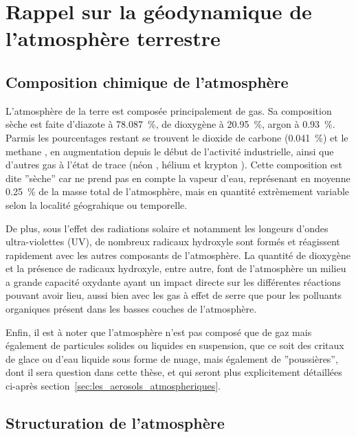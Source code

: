 
\section{Rappel sur la géodynamique de l'atmosphère terrestre}%
\label{sec:structure_atmosphere}

\subsection{Composition chimique de l'atmosphère}%
\label{ssub:composition_chimique_de_latmosphere}

L'atmosphère de la terre est composée principalement de gas. Sa composition sèche est
faite d'diazote  à \SI{78.087}{\percent}, de dioxygène  à
\SI{20.95}{\percent}, argon  à \SI{0.93}{\percent}. Parmis les pourcentages restant
se trouvent le dioxide de carbone  (\SI{0.041}{\percent}) et le methane ,
en augmentation depuis le début de l'activité industrielle, ainsi que d'autres gas à
l'état de trace (néon , hélium  et krypton ).  Cette composition est
dite ''sèche'' car ne prend pas en compte la vapeur d'eau, représenant en moyenne 
\SI{0.25}{\percent} de la masse total de l'atmosphère, mais en quantité extrèmement
variable selon la localité géograhique ou temporelle.

De plus, sous l'effet des radiations solaire et notamment les longeurs d'ondes
ultra-violettes (UV), de nombreux radicaux hydroxyle  sont formés et réagissent
rapidement avec les autres composants de l'atmosphère.  La quantité de dioxygène et la
présence de radicaux hydroxyle, entre autre, font de l'atmosphère un milieu a grande
capacité oxydante ayant un impact directe sur les différentes réactions pouvant avoir lieu,
aussi bien avec les gas à effet de serre que pour les polluants organiques présent dans
les basses couches de l'atmosphère.

Enfin, il est à noter que l'atmosphère n'est pas composé que de gaz mais également de
particules solides ou liquides en suspension, que ce soit des critaux de glace ou d'eau
liquide sous forme de nuage, mais également de ''poussières'', dont il sera question dans
cette thèse, et qui seront plus explicitement détaillées ci-après
section~\ref{sec:les_aerosols_atmospheriques}.

\subsection{Structuration de l'atmosphère}%
\label{sub:structuration_de_l_atmosphere}

